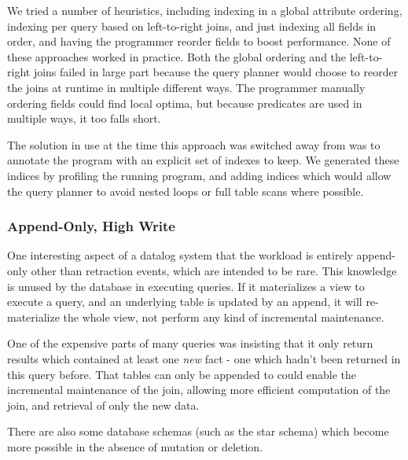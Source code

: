 We tried a number of heuristics, including indexing in a global attribute ordering, indexing per query based on left-to-right joins, and just indexing all fields in order, and having the programmer reorder fields to boost performance.
None of these approaches worked in practice.
Both the global ordering and the left-to-right joins failed in large part because the query planner would choose to reorder the joins at runtime in multiple different ways.
The programmer manually ordering fields could find local optima, but because predicates are used in multiple ways, it too falls short.

The solution in use at the time this approach was switched away from was to annotate the program with an explicit set of indexes to keep.
We generated these indices by profiling the running program, and adding indices which would allow the query planner to avoid nested loops or full table scans where possible.

\subsubsection{Append-Only, High Write}
One interesting aspect of a datalog system that the workload is entirely append-only other than retraction events, which are intended to be rare.
This knowledge is unused by the database in executing queries.
If it materializes a view to execute a query, and an underlying table is updated by an append, it will re-materialize the whole view, not perform any kind of incremental maintenance.

One of the expensive parts of many queries was insisting that it only return results which contained at least one \emph{new} fact - one which hadn't been returned in this query before.
That tables can only be appended to could enable the incremental maintenance of the join, allowing more efficient computation of the join, and retrieval of only the new data.

There are also some database schemas (such as the star schema) which become more possible in the absence of mutation or deletion.
